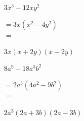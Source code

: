 \begin{tasks}
    \task \begin{exercise}$3x^3-12xy^2$
              \begin{envSolution}
                 $ =3x(x^2-4y^2)   $\\
                 $ = $				 
                     \begin{shortsolution}
  	                    $ 3x(x+2y)(x-2y)$
                     \end{shortsolution}
              \end{envSolution}%
          \end{exercise}

    \task \begin{exercise}$8a^5-18a^3b^2$
              \begin{envSolution}
                 $ =2a^3(4a^2-9b^2)   $\\
                 $ = $				 
                     \begin{shortsolution}
  	                    $2a^3(2a+3b)(2a-3b)$
                     \end{shortsolution}
              \end{envSolution}%
          \end{exercise}
\end{tasks}



\clearpage
